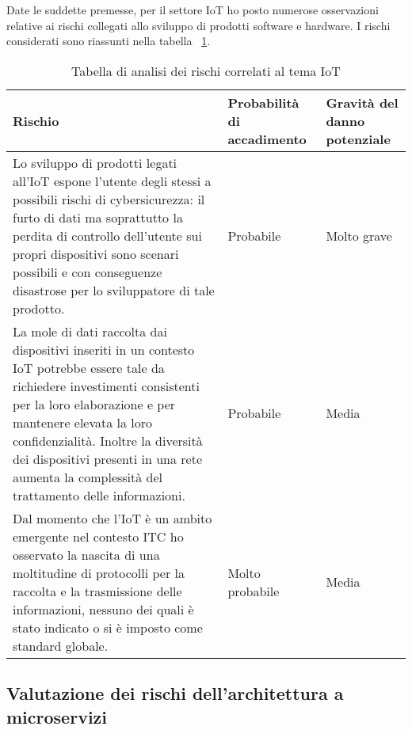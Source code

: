 Date le suddette premesse, per il settore IoT ho posto numerose osservazioni relative ai rischi collegati allo sviluppo di prodotti software e hardware. I rischi considerati sono riassunti nella tabella ~\ref{tab:rischi-iot}.
\begin{table}[H]
\caption{Tabella di analisi dei rischi correlati al tema IoT}
\label{tab:rischi-iot}
\begin{tabularx}{\linewidth}{|p{7.5cm}|X|X|}
\hline
\textbf{Rischio} & \textbf{Probabilità di accadimento} & \textbf{Gravità del danno potenziale}\\
\hline
Lo sviluppo di prodotti legati all'IoT espone l'utente degli stessi a possibili rischi di cybersicurezza: il furto di dati ma soprattutto la perdita di controllo dell'utente sui propri dispositivi sono scenari possibili e con conseguenze disastrose per lo sviluppatore di tale prodotto. & Probabile & Molto grave \\
\hline
La mole di dati raccolta dai dispositivi inseriti in un contesto IoT potrebbe essere tale da richiedere investimenti consistenti per la loro elaborazione e per mantenere elevata la loro confidenzialità. Inoltre la diversità dei dispositivi presenti in una rete aumenta la complessità del trattamento delle informazioni. & Probabile & Media \\
\hline
Dal momento che l'IoT è un ambito emergente nel contesto ITC ho osservato la nascita di una moltitudine di protocolli per la raccolta e la trasmissione delle informazioni, nessuno dei quali è stato indicato o si è imposto come standard globale. & Molto probabile & Media \\
\hline
\end{tabularx}
\end{table}


\subsection{Valutazione dei rischi dell'architettura a microservizi}

